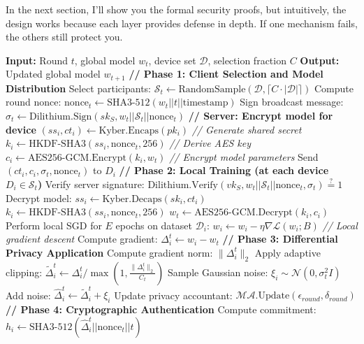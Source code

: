 \documentclass[journal,onecolumn]{IEEEtran}
\begin{document}
In the next section, I'll show you the formal security proofs, but intuitively, the design works because each layer provides defense in depth. If one mechanism fails, the others still protect you.
\label{alg:training}
\begin{algorithmic}[1]
\STATE \textbf{Input:} Round $t$, global model $w_t$, device set $\mathcal{D}$, selection fraction $C$
\STATE \textbf{Output:} Updated global model $w_{t+1}$
\STATE \textbf{// Phase 1: Client Selection and Model Distribution}
\STATE Select participants: $\mathcal{S}_t \leftarrow \text{RandomSample}(\mathcal{D}, \lceil C \cdot |\mathcal{D}| \rceil)$
\STATE Compute round nonce: $\text{nonce}_t \leftarrow \text{SHA3-512}(w_t || t || \text{timestamp})$
\STATE Sign broadcast message: $\sigma_t \leftarrow \text{Dilithium.Sign}(sk_S, w_t || \mathcal{S}_t || \text{nonce}_t)$
    \STATE \textbf{// Server: Encrypt model for device}
    \STATE $(ss_i, ct_i) \leftarrow \text{Kyber.Encaps}(pk_i)$ \textit{// Generate shared secret}
    \STATE $k_i \leftarrow \text{HKDF-SHA3}(ss_i, \text{nonce}_t, 256)$ \textit{// Derive AES key}
    \STATE $c_i \leftarrow \text{AES256-GCM.Encrypt}(k_i, w_t)$ \textit{// Encrypt model parameters}
    \STATE Send $(ct_i, c_i, \sigma_t, \text{nonce}_t)$ to $D_i$
\ENDFOR
\STATE \textbf{// Phase 2: Local Training (at each device $D_i \in \mathcal{S}_t$)}
\STATE Verify server signature: $\text{Dilithium.Verify}(vk_S, w_t || \mathcal{S}_t || \text{nonce}_t, \sigma_t) \stackrel{?}{=} 1$
\STATE Decrypt model: $ss_i \leftarrow \text{Kyber.Decaps}(sk_i, ct_i)$
\STATE $k_i \leftarrow \text{HKDF-SHA3}(ss_i, \text{nonce}_t, 256)$
\STATE $w_t \leftarrow \text{AES256-GCM.Decrypt}(k_i, c_i)$
\STATE Perform local SGD for $E$ epochs on dataset $\mathcal{D}_i$:
        \STATE $w_i \leftarrow w_i - \eta \nabla \mathcal{L}(w_i; B)$ \textit{// Local gradient descent}
    \ENDFOR
\ENDFOR
\STATE Compute gradient: $\Delta_i^t \leftarrow w_i - w_t$
\STATE \textbf{// Phase 3: Differential Privacy Application}
\STATE Compute gradient norm: $\|\Delta_i^t\|_2$
\STATE Apply adaptive clipping: $\tilde{\Delta}_i^t \leftarrow \Delta_i^t / \max(1, \frac{\|\Delta_i^t\|_2}{C_t})$
\STATE Sample Gaussian noise: $\xi_i \sim \mathcal{N}(0, \sigma_t^2 I)$
\STATE Add noise: $\hat{\Delta}_i^t \leftarrow \tilde{\Delta}_i^t + \xi_i$
\STATE Update privacy accountant: $\mathcal{MA}.\text{Update}(\epsilon_{round}, \delta_{round})$
\STATE \textbf{// Phase 4: Cryptographic Authentication}
\STATE Compute commitment: $h_i \leftarrow \text{SHA3-512}(\hat{\Delta}_i^t || \text{nonce}_t || t)$

\end{algorithmic}
\end{document}
